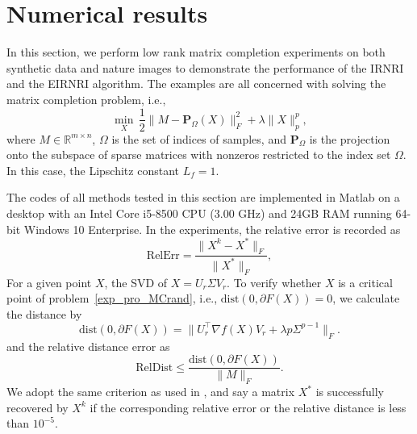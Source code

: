 \documentclass[twoside,11pt]{article}
\numberwithin{equation}{section}
\begin{document}

\section{Numerical results} 
In this section, we perform low rank matrix completion experiments on both synthetic data and nature images to demonstrate the performance of the IRNRI and the EIRNRI algorithm. 
The examples are all concerned with solving the matrix completion problem, {i.e.},
\begin{equation}\label{exp_pro_MCrand}
    \min\limits_{X}\, \frac{1}{2}\|M-\mathbf{P}_{\Omega} (X)\|_{F}^{2} + \lambda\|X\|_{p}^{p},
\end{equation}
where $M\in\mathbb{R}^{m\times n} $, $\Omega $ is the set of indices of samples, and $\mathbf{P}_{\Omega}$ is the projection onto the subspace of sparse matrices with nonzeros restricted to the index set $\Omega$. 
In this case, the Lipschitz constant $L_{f} = 1$. %

The codes of all methods tested in this section are implemented in Matlab on a desktop with an Intel Core i5-8500 CPU  (3.00 GHz) and 24GB RAM running 64-bit Windows 10 Enterprise. 
In the experiments, the relative error is recorded as
\begin{equation}
    \text{RelErr} = \frac{\|X^{k}-X^{*}\|_{F} }{\|X^{*}\|_{F}},
\end{equation}
For a given point $X$, the SVD of $X=U_{r}\Sigma V_{r}$.  
 To verify whether $X$ is a critical point of problem~\eqref{exp_pro_MCrand}, {i.e.}, $\text{dist} (0,\partial F (X)) = 0$,  
 we calculate \cite{opt_simu_svd_2017} the distance  by 
\begin{equation}
    \text{dist} (0,\partial F (X)) = \|U_{r}^{\top}\nabla f (X)V_{r}+\lambda p \Sigma^{p-1} \|_{F}.
\end{equation}
and the relative distance error as
\begin{equation}
    \text{RelDist} \le \frac{\text{dist} (0,\partial F (X))}{\|M\|_{F}}.
\end{equation}
We adopt the same criterion as used in  \cite{ExpCriterion_2010,opt_simu_svd_2017}, and say a matrix $X^{*} $ is successfully recovered by $X^{k}$ if the corresponding relative error or the relative distance is less than $10^{-5}$.
\end{document}
